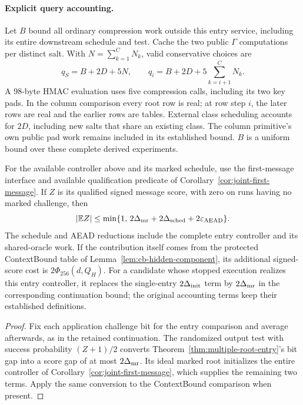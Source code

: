 \paragraph{Explicit query accounting.}
Let $B$ bound all ordinary compression work outside this entry service,
including its entire downstream schedule and test. Cache the two public
$\Gamma$ computations per distinct salt. With
$N=\sum_{k=1}^{C}N_k$, valid conservative choices are
\begin{equation}
 q_S=B+2D+5N,\qquad
 q_i=B+2D+5\sum_{k=i+1}^{C}N_k.
 \label{eq:multiple-root-budgets}
\end{equation}
A 98-byte HMAC evaluation uses five compression calls, including its two key
pads. In the column comparison every root row is real; at row step $i$, the
later rows are real and the earlier rows are tables. External class scheduling
accounts for $2D$, including new salts that share an existing class. The
column primitive's own public pad work remains included in its established
bound. $B$ is a uniform bound over these complete derived experiments.

\begin{corollary}
\label{cor:multiple-root-message}
For the available controller above and its marked schedule, use the
first-message interface and available qualification predicate of Corollary~\ref{cor:joint-first-message}. If $Z$
is its qualified signed message score, with zero on runs having no marked
challenge, then
\begin{equation}
 |\mathbb E Z|\le
 \min\{1,\,2\Delta_{\rm mr}+2\Delta_{\rm sched}
                      +2\varepsilon_{\rm AEAD}\}.
 \label{eq:multiple-root-message}
\end{equation}
The schedule and AEAD reductions include the complete entry controller and
its shared-oracle work. If the contribution itself comes from the protected
ContextBound table of Lemma~\ref{lem:cb-hidden-component}, its additional
signed-score cost is $2\Phi_{256}(d,Q_H)$. For a candidate whose stopped execution realizes this entry controller,
it replaces the single-entry $2\Delta_{\rm init}$ term by
$2\Delta_{\rm mr}$ in the corresponding continuation bound; the original accounting terms keep their
established definitions.
\end{corollary}
\begin{proof}
Fix each application challenge bit for the entry comparison and average
afterwards, as in the retained continuation. The randomized output test
with success probability $(Z+1)/2$ converts
Theorem~\ref{thm:multiple-root-entry}'s bit gap into a score gap of at most
$2\Delta_{\rm mr}$. Its ideal marked root initializes the entire controller
of Corollary~\ref{cor:joint-first-message}, which supplies the remaining two
terms. Apply the same conversion to the ContextBound comparison when present.
\end{proof}

